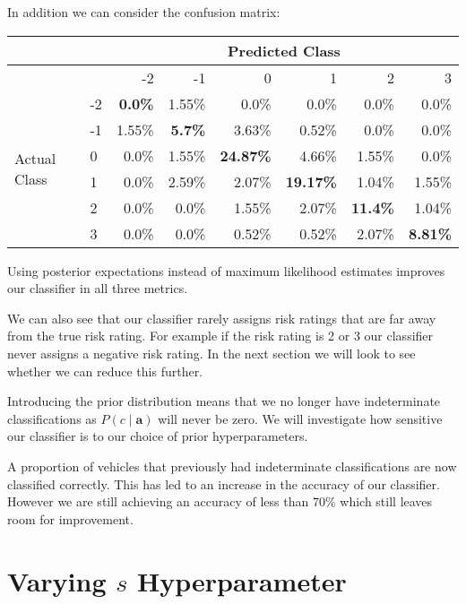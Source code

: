 In addition we can consider the confusion matrix:
\begin{center}
    \begin{tabular}{l l r r r r r r}
    \hline
                       &    & \multicolumn{6}{c}{Predicted Class}                   \\
    \hline
                       &    & -2      & -1    & 0       & 1       & 2       & 3     \\
    \hline
    \multirow{6}{*}{Actual Class} & -2 & \textbf{0.0\%}  & 1.55\% & 0.0\%   & 0.0\%   & 0.0\%  & 0.0\%  \\
                       & -1 & 1.55\% & \textbf{5.7\%}   & 3.63\%  & 0.52\%  & 0.0\%  & 0.0\%  \\
                       & 0  & 0.0\%  & 1.55\% & \textbf{24.87\%}  & 4.66\%  & 1.55\% & 0.0\%  \\
                       & 1  & 0.0\%  & 2.59\% & 2.07\%  & \textbf{19.17\%}  & 1.04\% & 1.55\% \\
                       & 2  & 0.0\%  & 0.0\%  & 1.55\%  & 2.07\%  & \textbf{11.4\%}  & 1.04\% \\
                       & 3  & 0.0\%  & 0.0\%  & 0.52\%  & 0.52\%  & 2.07\% & \textbf{8.81\%} \\
    \hline
    \end{tabular}
\end{center}

Using posterior expectations instead of maximum likelihood estimates improves our classifier in all three metrics.

We can also see that our classifier rarely assigns risk ratings that are far away from the true risk rating.
For example if the risk rating is 2 or 3 our classifier never assigns a negative risk rating.
In the next section we will look to see whether we can reduce this further.

Introducing the prior distribution means that we no longer have indeterminate classifications as $P(c \mid \mathbf{a})$ will never be zero.
We will investigate how sensitive our classifier is to our choice of prior hyperparameters.

A proportion of vehicles that previously had indeterminate classifications are now classified correctly.
This has led to an increase in the accuracy of our classifier.
However we are still achieving an accuracy of less than 70\% which still leaves room for improvement.

\section{Varying $s$ Hyperparameter}

